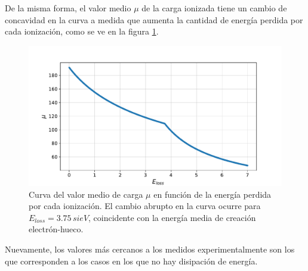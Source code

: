 De la misma forma, el valor medio $\mu$ de la carga ionizada tiene un cambio de concavidad en la curva a medida que aumenta la cantidad de energía perdida por cada ionización, como se ve en la figura \ref{fig:ElossVsMu}.
\begin{figure}%
    \centering
    \includegraphics[scale=0.5]{Figs/ELoss_vs_mu_5ktrials_0-7Eloss.pdf}
    \caption{\footnotesize{Curva del valor medio de carga $\mu$ en función de la energía perdida por cada ionización. El cambio abrupto en la curva ocurre para $E_{loss} = 3.75\,si{eV}$, coincidente con la energía media de creación electrón-hueco.}}
    \label{fig:ElossVsMu}
\end{figure}
Nuevamente, los valores más cercanos a los medidos experimentalmente son los que corresponden a los casos en los que no hay disipación de energía.

